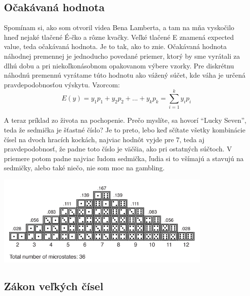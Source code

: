 \begin{Shaded}
\begin{Highlighting}[]
\end{Highlighting}
\end{Shaded}

\hypertarget{oux10dakuxe1vanuxe1-hodnota}{%
\subsection{Očakávaná hodnota}\label{oux10dakuxe1vanuxe1-hodnota}}

Spomínam si, ako som otvoril videa Bena Lamberta, a tam na mňa vyskočilo
hneď nejaké tlačené É-čko a rôzne kvačky. Veľké tlačené E znamená
expected value, teda očakávaná hodnota. Je to tak, ako to znie.
Očakávaná hodnota náhodnej premennej je jednoducho povedané priemer,
ktorý by sme vyrátali za dlhú dobu a pri niekoľkonásobnom opakovanom
výbere vzorky. Pre diskrétnu náhodnú premennú vyrátame túto hodnotu ako
vážený súčet, kde váha je určená pravdepodobnosťou výskytu. Vzorcom:
\[E(y)= y_1p_1 + y_2p_2 + ... + y_kp_k = \sum_{i=1}^{k}y_ip_i\]

A teraz príklad zo života na pochopenie. Prečo myslíte, sa hovorí
``Lucky Seven'', teda že sedmička je šťastné číslo? Je to preto, lebo
keď sčítate všetky kombinácie čísel na dvoch hracích kockách, najviac
hodnôt vyjde pre 7, teda aj pravdepodobnosť, že padne toto číslo je
väčšia, ako pri ostatných súčtoch. V priemere potom padne najviac ľudom
sedmička, ľudia si to všímajú a stavujú na sedmičky, alebo také niečo,
nie som moc na gambling.

\begin{center}

\includegraphics[width=0.8\textwidth,height=\textheight]{diplomka obrazky/5.png}

\end{center}

\hypertarget{zuxe1kon-veux13ekuxfdch-ux10duxedsel}{%
\subsection{Zákon veľkých
čísel}\label{zuxe1kon-veux13ekuxfdch-ux10duxedsel}}

